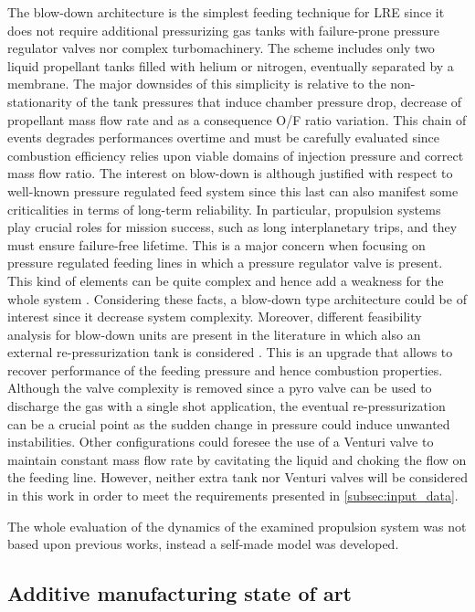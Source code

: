 The blow-down architecture is the simplest feeding technique for LRE since it does not require additional pressurizing gas tanks with failure-prone pressure regulator valves nor complex turbomachinery. The scheme includes only two liquid propellant tanks filled with helium or nitrogen, eventually separated by a membrane.
The major downsides of this simplicity is relative to the non-stationarity of the tank pressures that induce chamber pressure drop, decrease of propellant mass flow rate  and as a consequence O/F ratio variation. This chain of events degrades performances overtime and must be carefully evaluated since combustion efficiency relies upon viable domains of injection pressure and correct mass flow ratio.
The interest on blow-down is although justified with respect to well-known pressure regulated feed system since this last can also manifest some criticalities in terms of long-term reliability. In particular, propulsion systems play crucial roles for mission success, such as long interplanetary trips, and they must ensure failure-free lifetime.
This is a major concern when focusing on pressure regulated feeding lines in which a pressure regulator valve is present. This kind of elements can be quite complex and hence add a weakness for the whole system \cite{valve_criticalities}.
Considering these facts, a blow-down type architecture could be of interest since it decrease system complexity. Moreover, different feasibility analysis for blow-down units are present in the literature in which also an external re-pressurization tank is considered \cite{repressurization}.
This is an upgrade that allows to recover performance of the feeding pressure and hence combustion properties. Although the valve complexity is removed since a pyro valve can be used to discharge the gas with a single shot application, the eventual re-pressurization can be a crucial point as the sudden change in pressure could induce unwanted instabilities.
Other configurations could foresee the use of a Venturi valve to maintain constant mass flow rate by cavitating the liquid and choking the flow on the feeding line. However, neither extra tank nor Venturi valves will be considered in this work in order to meet the requirements presented in \autoref{subsec:input_data}.

The whole evaluation of the dynamics of the examined propulsion system was not based upon previous works, instead a self-made model was developed.

\subsection{Additive manufacturing state of art}
\label{subsec:additive_intro}

